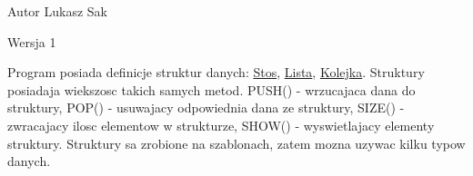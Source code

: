 \begin{DoxyAuthor}{Autor}
Lukasz Sak 
\end{DoxyAuthor}
\begin{DoxyVersion}{Wersja}
1
\end{DoxyVersion}
Program posiada definicje struktur danych: \hyperlink{class_stos}{Stos}, \hyperlink{class_lista}{Lista}, \hyperlink{class_kolejka}{Kolejka}. Struktury posiadaja wiekszosc takich samych metod. PUSH() -\/ wrzucajaca dana do struktury, POP() -\/ usuwajacy odpowiednia dana ze struktury, SIZE() -\/ zwracajacy ilosc elementow w strukturze, SHOW() -\/ wyswietlajacy elementy struktury. Struktury sa zrobione na szablonach, zatem mozna uzywac kilku typow danych. 